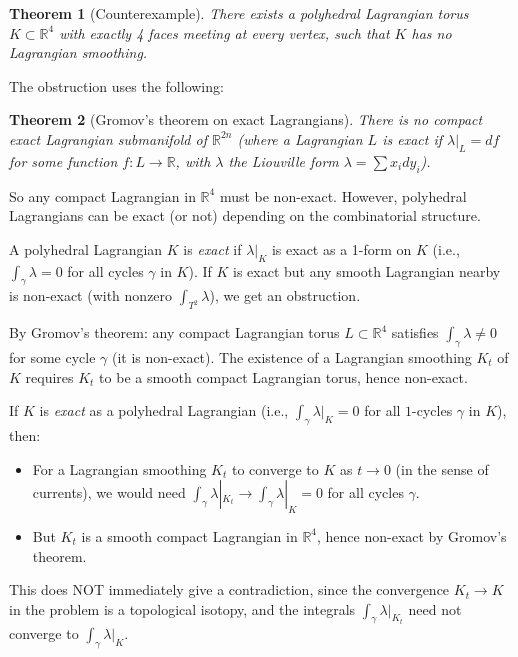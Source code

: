 \documentclass[12pt]{article}
\newtheorem{theorem}{Theorem}
\theoremstyle{definition}
\begin{document}
\begin{theorem}[Counterexample]\label{thm:counterexample}
There exists a polyhedral Lagrangian torus $K\subset\mathbb{R}^4$ with exactly 4 faces meeting at every vertex, such that $K$ has no Lagrangian smoothing.
\end{theorem}

The obstruction uses the following:

\begin{theorem}[Gromov's theorem on exact Lagrangians]\label{thm:gromov}
There is no compact exact Lagrangian submanifold of $\mathbb{R}^{2n}$ (where a Lagrangian $L$ is \emph{exact} if $\lambda|_L = df$ for some function $f: L\to\mathbb{R}$, with $\lambda$ the Liouville form $\lambda = \sum x_i dy_i$).
\end{theorem}

So any compact Lagrangian in $\mathbb{R}^4$ must be non-exact. However, polyhedral Lagrangians can be exact (or not) depending on the combinatorial structure.

A polyhedral Lagrangian $K$ is \emph{exact} if $\lambda|_K$ is exact as a 1-form on $K$ (i.e., $\int_\gamma\lambda = 0$ for all cycles $\gamma$ in $K$). If $K$ is exact but any smooth Lagrangian nearby is non-exact (with nonzero $\int_{T^2}\lambda$), we get an obstruction.

By Gromov's theorem: any compact Lagrangian torus $L\subset\mathbb{R}^4$ satisfies $\int_\gamma\lambda\neq 0$ for some cycle $\gamma$ (it is non-exact). The existence of a Lagrangian smoothing $K_t$ of $K$ requires $K_t$ to be a smooth compact Lagrangian torus, hence non-exact.

If $K$ is \emph{exact} as a polyhedral Lagrangian (i.e., $\int_\gamma\lambda|_K = 0$ for all $1$-cycles $\gamma$ in $K$), then:
\begin{itemize}
\item For a Lagrangian smoothing $K_t$ to converge to $K$ as $t\to 0$ (in the sense of currents), we would need $\int_\gamma\lambda|_{K_t}\to\int_\gamma\lambda|_K = 0$ for all cycles $\gamma$.
\item But $K_t$ is a smooth compact Lagrangian in $\mathbb{R}^4$, hence non-exact by Gromov's theorem.
\end{itemize}

This does NOT immediately give a contradiction, since the convergence $K_t\to K$ in the problem is a topological isotopy, and the integrals $\int_\gamma\lambda|_{K_t}$ need not converge to $\int_\gamma\lambda|_K$.
\end{document}
